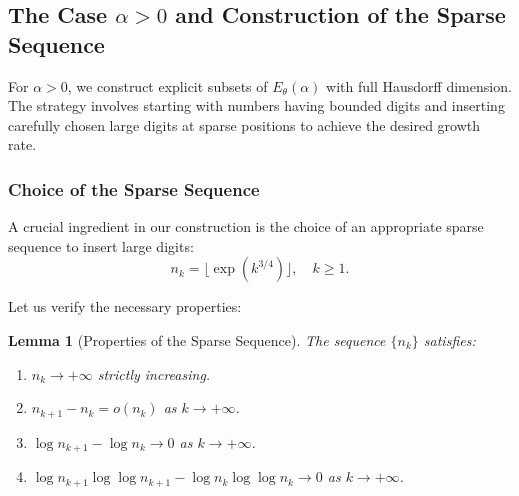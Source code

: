 \documentclass{article}
\newtheorem{lemma}[theorem]{Lemma}
\numberwithin{equation}{section}
\begin{document}
\subsection{The Case $\alpha > 0$ and Construction of the Sparse Sequence}

For $\alpha > 0$, we construct explicit subsets of $E_\theta(\alpha)$ with full Hausdorff dimension. The strategy involves starting with numbers having bounded digits and inserting carefully chosen large digits at sparse positions to achieve the desired growth rate.

\subsubsection{Choice of the Sparse Sequence}

A crucial ingredient in our construction is the choice of an appropriate sparse sequence to insert large digits:
\[
n_k = \lfloor \exp(k^{3/4}) \rfloor, \quad k \geq 1.
\]

Let us verify the necessary properties:

\begin{lemma}[Properties of the Sparse Sequence] \label{lem:sequence_properties}
The sequence $\{n_k\}$ satisfies:
\begin{enumerate}
\item[(a)] $n_k \to +\infty$ strictly increasing.
\item[(b)] $n_{k+1} - n_k = o(n_k)$ as $k \to +\infty$.
\item[(c)] $\log n_{k+1} - \log n_k \to 0$ as $k \to +\infty$.
\item[(d)] $\log n_{k+1} \log \log n_{k+1} - \log n_k \log \log n_k \to 0$ as $k \to +\infty$.
\end{enumerate}
\end{lemma}
\end{document}
